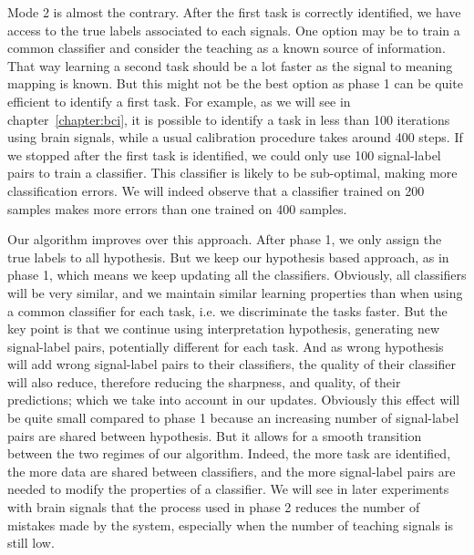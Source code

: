 
Mode 2 is almost the contrary. After the first task is correctly identified, we have access to the true labels associated to each signals. One option may be to train a common classifier and consider the teaching as a known source of information. That way learning a second task should be a lot faster as the signal to meaning mapping is known. But this might not be the best option as phase 1 can be quite efficient to identify a first task. For example, as we will see in chapter~\ref{chapter:bci}, it is possible to identify a task in less than 100 iterations using brain signals, while a usual calibration procedure takes around 400 steps. If we stopped after the first task is identified, we could only use 100 signal-label pairs to train a classifier. This classifier is likely to be sub-optimal, making more classification errors. We will indeed observe that a classifier trained on 200 samples makes more errors than one trained on 400 samples.

Our algorithm improves over this approach. After phase 1, we only assign the true labels to all hypothesis. But we keep our hypothesis based approach, as in phase 1, which means we keep updating all the classifiers. Obviously, all classifiers will be very similar, and we maintain similar learning properties than when using a common classifier for each task, i.e. we discriminate the tasks faster. But the key point is that we continue using interpretation hypothesis, generating new signal-label pairs, potentially different for each task. And as wrong hypothesis will add wrong signal-label pairs to their classifiers, the quality of their classifier will also reduce, therefore reducing the sharpness, and quality, of their predictions; which we take into account in our updates. Obviously this effect will be quite small compared to phase 1 because an increasing number of signal-label pairs are shared between hypothesis. But it allows for a smooth transition between the two regimes of our algorithm. Indeed, the more task are identified, the more data are shared between classifiers, and the more signal-label pairs are needed to modify the properties of a classifier. We will see in later experiments with brain signals that the process used in phase 2 reduces the number of mistakes made by the system, especially when the number of teaching signals is still low.

